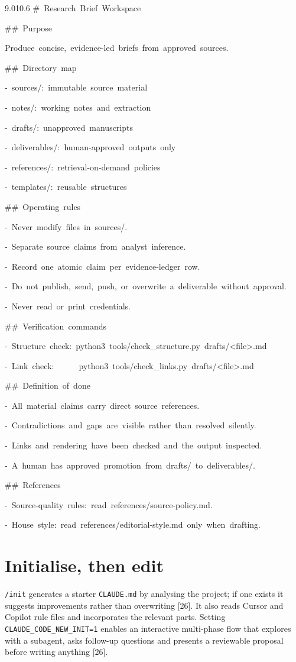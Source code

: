 \documentclass[11pt,a4paper,twoside,openany]{book}
\newcommand{\cl}[1]{\noindent\mbox{#1}\par}
\begin{document}
\begin{codeblock}{9.0}{10.6}
\cl{\#~Research~Brief~Workspace}
\cl{}
\cl{\#\#~Purpose}
\cl{Produce~concise,~evidence-led~briefs~from~approved~sources.}
\cl{}
\cl{\#\#~Directory~map}
\cl{-~\textasciigrave{}sources/\textasciigrave{}:~immutable~source~material}
\cl{-~\textasciigrave{}notes/\textasciigrave{}:~working~notes~and~extraction}
\cl{-~\textasciigrave{}drafts/\textasciigrave{}:~unapproved~manuscripts}
\cl{-~\textasciigrave{}deliverables/\textasciigrave{}:~human-approved~outputs~only}
\cl{-~\textasciigrave{}references/\textasciigrave{}:~retrieval-on-demand~policies}
\cl{-~\textasciigrave{}templates/\textasciigrave{}:~reusable~structures}
\cl{}
\cl{\#\#~Operating~rules}
\cl{-~Never~modify~files~in~\textasciigrave{}sources/\textasciigrave{}.}
\cl{-~Separate~source~claims~from~analyst~inference.}
\cl{-~Record~one~atomic~claim~per~evidence-ledger~row.}
\cl{-~Do~not~publish,~send,~push,~or~overwrite~a~deliverable~without~approval.}
\cl{-~Never~read~or~print~credentials.}
\cl{}
\cl{\#\#~Verification~commands}
\cl{-~Structure~check:~\textasciigrave{}python3~tools/check\_structure.py~drafts/<file>.md\textasciigrave{}}
\cl{-~Link~check:~~~~~~\textasciigrave{}python3~tools/check\_links.py~drafts/<file>.md\textasciigrave{}}
\cl{}
\cl{\#\#~Definition~of~done}
\cl{-~All~material~claims~carry~direct~source~references.}
\cl{-~Contradictions~and~gaps~are~visible~rather~than~resolved~silently.}
\cl{-~Links~and~rendering~have~been~checked~and~the~output~inspected.}
\cl{-~A~human~has~approved~promotion~from~\textasciigrave{}drafts/\textasciigrave{}~to~\textasciigrave{}deliverables/\textasciigrave{}.}
\cl{}
\cl{\#\#~References}
\cl{-~Source-quality~rules:~read~\textasciigrave{}references/source-policy.md\textasciigrave{}.}
\cl{-~House~style:~read~\textasciigrave{}references/editorial-style.md\textasciigrave{}~only~when~drafting.}
\end{codeblock}

\FloatBarrier
\setcounter{section}{2}
\section{Initialise, then edit}

\texttt{/\allowbreak{}init} generates a starter \texttt{CLAUDE.\allowbreak{}md} by analysing the project; if one exists it suggests improvements rather than overwriting [26]. It also reads Cursor and Copilot rule files and incorporates the relevant parts. Setting \texttt{CLAUDE\_\allowbreak{}CODE\_\allowbreak{}NEW\_\allowbreak{}INIT=\allowbreak{}1} enables an interactive multi-phase flow that explores with a subagent, asks follow-up questions and presents a reviewable proposal before writing anything [26].
\end{document}
